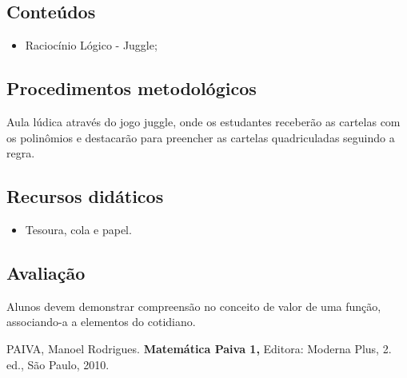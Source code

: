 \documentclass[oneside,a4paper,12pt]{article}
\begin{document}
  \begin{snugshade}
  \section{Conteúdos} %
  \end{snugshade}

    \begin{itemize}

      \item Raciocínio Lógico - Juggle;

    \end{itemize}

  \begin{snugshade}
  \section{Procedimentos metodológicos} %
  \end{snugshade}

  Aula lúdica através do jogo juggle, onde os estudantes receberão as cartelas com os
  polinômios e destacarão para preencher as cartelas quadriculadas seguindo a regra.

  \begin{snugshade}
  \section{Recursos didáticos} %
  \end{snugshade}

    \begin{itemize}

	  \item Tesoura, cola e papel.

    \end{itemize}

  \begin{snugshade}
  \section{Avaliação} %
  \end{snugshade}

  Alunos devem demonstrar compreensão no conceito de valor de uma função, associando-a a elementos do cotidiano.




\begin{thebibliography}{}

PAIVA, Manoel Rodrigues.
\newblock \textbf{Matemática Paiva 1,}
\newblock Editora: Moderna Plus, 2. ed., São Paulo, 2010.

\end{thebibliography}
\end{document}
